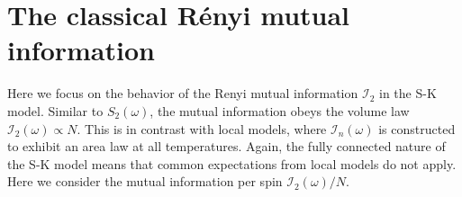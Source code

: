 \documentclass[twocolumn,superscriptaddress,prb,10pt]{revtex4-1}
\begin{document}
\section{The classical R\'enyi mutual information}
\label{I2-section}

Here we focus on the behavior of the Renyi mutual information ${\mathcal I}_2$ in 
the S-K model. Similar to $S_2(\omega)$, the mutual information obeys the volume 
law ${\mathcal I}_2(\omega)\propto N$. This is in contrast with local models, 
where ${\mathcal I}_n(\omega)$ is constructed to exhibit an area law at all temperatures.
Again, the fully connected nature of the S-K model means that common expectations from local models
do not apply.  Here we consider the mutual information per spin ${\mathcal I}_2(\omega)/N$. 
\end{document}
